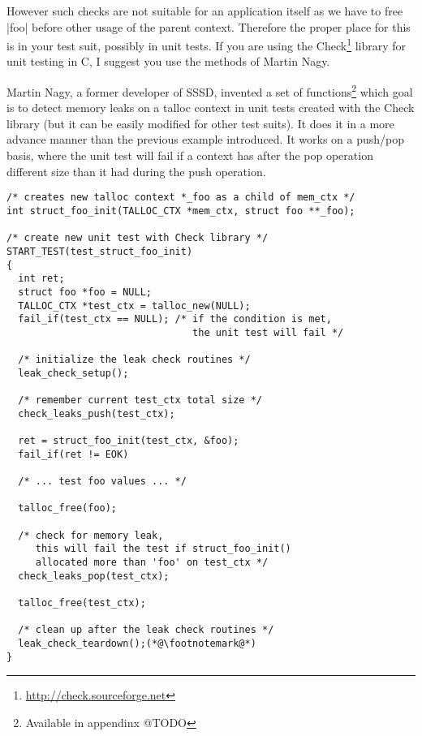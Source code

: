 However such checks are not suitable for an application itself as we have to
free |foo| before other usage of the parent context. Therefore the proper place
for this is in your test suit, possibly in unit tests. If you are using the
Check\footnote{\url{http://check.sourceforge.net}} library for unit testing in
C, I suggest you use the methods of Martin Nagy.

Martin Nagy, a former developer of SSSD, invented a set of
functions\footnote{Available in appendinx @TODO} which goal is to detect memory
leaks on a talloc context in unit tests created with the Check library (but it
can be easily modified for other test suits). It does it in a more advance
manner than the previous example introduced. It works on a push/pop basis,
where the unit test will fail if a context has after the pop operation
different size than it had during the push operation.

\begin{lstlisting}[caption={Martin Nagy's leak check routines},
morekeywords={leak_check_setup,check_leaks_push,
              check_leaks_pop,leak_check_teardown}]
/* creates new talloc context *_foo as a child of mem_ctx */
int struct_foo_init(TALLOC_CTX *mem_ctx, struct foo **_foo);

/* create new unit test with Check library */
START_TEST(test_struct_foo_init)
{
  int ret;
  struct foo *foo = NULL;
  TALLOC_CTX *test_ctx = talloc_new(NULL);
  fail_if(test_ctx == NULL); /* if the condition is met,
                                the unit test will fail */
  
  /* initialize the leak check routines */
  leak_check_setup();
  
  /* remember current test_ctx total size */
  check_leaks_push(test_ctx);
  
  ret = struct_foo_init(test_ctx, &foo);
  fail_if(ret != EOK)
  
  /* ... test foo values ... */
  
  talloc_free(foo);
  
  /* check for memory leak,
     this will fail the test if struct_foo_init()
     allocated more than 'foo' on test_ctx */
  check_leaks_pop(test_ctx);
  
  talloc_free(test_ctx);
  
  /* clean up after the leak check routines */
  leak_check_teardown();(*@\footnotemark@*)
}
\end{lstlisting}

% 
%     
% 
% 

\label{talloc:sec:debugging}